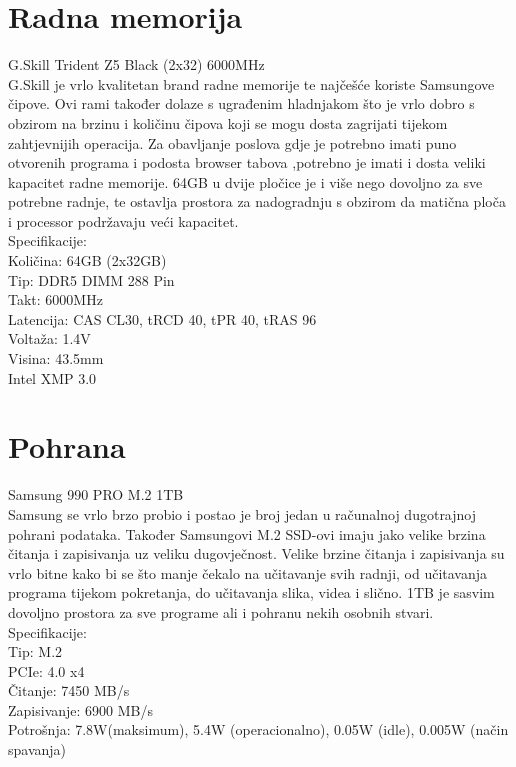 \documentclass{report}
\begin{document}
\chapter{Radna memorija}
G.Skill Trident Z5 Black (2x32) 6000MHz
\\G.Skill je vrlo kvalitetan brand radne memorije te najčešće koriste Samsungove čipove. Ovi rami također dolaze s ugrađenim hladnjakom što je vrlo dobro s obzirom na brzinu i količinu čipova koji se mogu dosta zagrijati tijekom zahtjevnijih operacija. Za obavljanje poslova gdje je potrebno imati puno otvorenih programa i podosta browser tabova ,potrebno je imati i dosta veliki kapacitet radne memorije. 64GB u dvije pločice je i više nego dovoljno za sve potrebne radnje, te ostavlja prostora za nadogradnju s obzirom da matična ploča i processor podržavaju veći kapacitet.
\\Specifikacije:
\\Količina: 64GB (2x32GB)
\\Tip: DDR5 DIMM 288 Pin
\\Takt: 6000MHz
\\Latencija: CAS CL30, tRCD 40, tPR 40, tRAS 96
\\Voltaža: 1.4V
\\Visina: 43.5mm
\\Intel XMP 3.0



\chapter{Pohrana}
Samsung 990 PRO M.2 1TB
\\ Samsung se vrlo brzo probio i postao je broj jedan u računalnoj dugotrajnoj pohrani podataka. Također Samsungovi M.2 SSD-ovi imaju jako velike brzina čitanja i zapisivanja uz veliku dugovječnost. Velike brzine čitanja i zapisivanja su vrlo bitne kako bi se što manje čekalo na učitavanje svih radnji, od učitavanja programa tijekom pokretanja, do učitavanja slika, videa i slično. 1TB je sasvim dovoljno prostora za sve programe ali i pohranu nekih osobnih stvari.
\\Specifikacije:
\\Tip: M.2
\\PCIe: 4.0 x4
\\Čitanje: 7450 MB/s
\\Zapisivanje: 6900 MB/s
\\Potrošnja: 7.8W(maksimum), 5.4W (operacionalno), 0.05W (idle), 0.005W (način spavanja)
\end{document}
